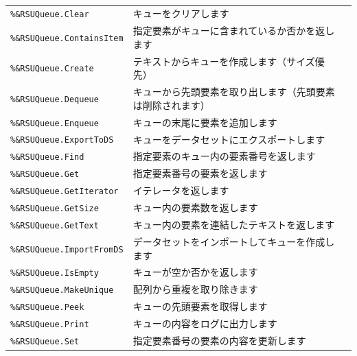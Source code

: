 \paragraph{\DocStrTitleRDMPackageFunctionList}
\begin{center}
{\footnotesize
\begin{xltabular}{\textwidth}{|p{4truecm}|X|p{1.2truecm}|}
\hline
\thead{\DocStrHeaderFunctionName}&\thead{\DocStrDescription}&\thead{\DocStrRefto}\\
\hline
\hline
\texttt{\%\&RSUQueue.Clear}&キューをクリアします&\\
\hline
\texttt{\%\&RSUQueue.ContainsItem}&指定要素がキューに含まれているか否かを返します&\\
\hline
\texttt{\%\&RSUQueue.Create}&テキストからキューを作成します（サイズ優先）&\\
\hline
\texttt{\%\&RSUQueue.Dequeue}&キューから先頭要素を取り出します（先頭要素は削除されます）&\\
\hline
\texttt{\%\&RSUQueue.Enqueue}&キューの末尾に要素を追加します&\\
\hline
\texttt{\%\&RSUQueue.ExportToDS}&キューをデータセットにエクスポートします&\\
\hline
\texttt{\%\&RSUQueue.Find}&指定要素のキュー内の要素番号を返します&\\
\hline
\texttt{\%\&RSUQueue.Get}&指定要素番号の要素を返します&\\
\hline
\texttt{\%\&RSUQueue.GetIterator}&イテレータを返します&\\
\hline
\texttt{\%\&RSUQueue.GetSize}&キュー内の要素数を返します&\\
\hline
\texttt{\%\&RSUQueue.GetText}&キュー内の要素を連結したテキストを返します&\\
\hline
\texttt{\%\&RSUQueue.ImportFromDS}&データセットをインポートしてキューを作成します&\\
\hline
\texttt{\%\&RSUQueue.IsEmpty}&キューが空か否かを返します&\\
\hline
\texttt{\%\&RSUQueue.MakeUnique}&配列から重複を取り除きます&\\
\hline
\texttt{\%\&RSUQueue.Peek}&キューの先頭要素を取得します&\\
\hline
\texttt{\%\&RSUQueue.Print}&キューの内容をログに出力します&\\
\hline
\texttt{\%\&RSUQueue.Set}&指定要素番号の要素の内容を更新します&\\
\hline
\end{xltabular}
}
\end{center}
